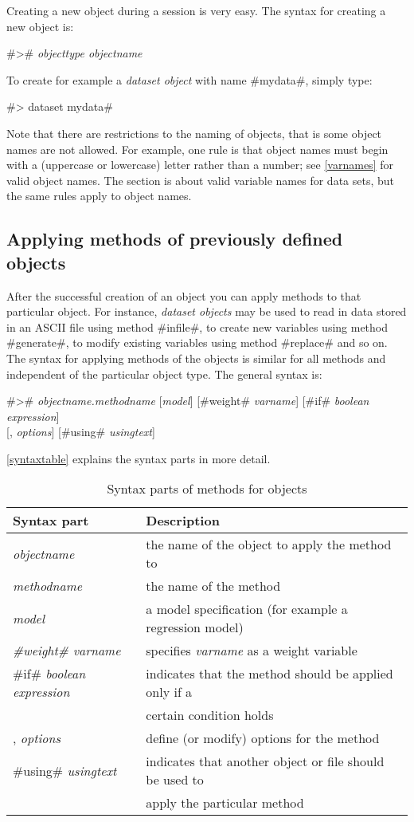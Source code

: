 Creating a new object during a session is very easy. The syntax for creating a new object is:

#># {\em objecttype objectname}

To create for example a {\em dataset object} with name #mydata#, simply type:

#> dataset mydata#

Note that there are restrictions to the naming of objects, that is
some object names are not allowed. For example, one rule is that
object names must begin with a (uppercase or lowercase) letter
rather than a number; see \autoref{varnames} for valid object
names. The section is about valid variable names for data sets,
but the same rules apply to object names.

\subsection{Applying methods of previously defined objects}

After the successful creation of an object you can apply methods
to that particular object. For instance, {\em dataset objects} may
be used to read in data stored in an ASCII file using method
#infile#, to create new variables using method #generate#, to
modify existing variables using method #replace# and so on. The
syntax for applying methods of the objects is similar for all
methods
and independent of the particular object type. The general syntax is: \\
 

#># {\em objectname.methodname} [{\em model}] [#weight# {\em varname}] [#if# {\em boolean expression}]  \\
\hspace*{4.8cm}  [, {\em options}] [#using# {\em usingtext}]

\autoref{syntaxtable} explains the syntax parts in more detail.


\begin{table}[ht]
 \centering
\begin{tabular}{|l|l|}
\hline
Syntax part & Description \\
\hline
{\em objectname} & the name of the object to apply the method to \\
{\em methodname} & the name of the method \\
{\em model} & a model specification (for example a regression model) \\
{\em #weight# varname} & specifies {\em varname} as a weight variable \\
#if# {\em boolean expression} & indicates that the method should be applied only if a \\
& certain condition holds \\
, {\em options} & define (or modify) options for the method \\
#using# {\em usingtext} & indicates that another object or file should be used to \\
& apply the particular method \\
\hline
\end{tabular}
{\em \caption{\label{syntaxtable}Syntax parts of methods for
objects}}
\end{table}



